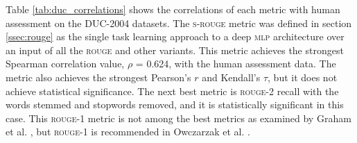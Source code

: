 \documentclass[11pt,a4paper]{article}
\newcommand{\rouge}{\textsc{rouge}\xspace}
\newcommand{\mlp}{\textsc{mlp}\xspace}
\newcommand{\duc}{\textsc{DUC-2004}\xspace}
\newcommand{\srouge}{\textsc{s-rouge}\xspace}
\begin{document}
Table \ref{tab:duc_correlations} shows the correlations of each metric with human assessment 
on the \duc datasets. The \srouge metric was defined in section \ref{ssec:rouge} as the 
single task learning approach to a deep \mlp architecture over an input of all the \rouge 
and other variants. This metric achieves the strongest Spearman correlation value, $\rho$ = 0.624, 
with the human assessment data. The metric also achieves the strongest Pearson's $r$ and 
Kendall's $\tau$, but it does not achieve statistical significance. The next best metric 
is \rouge-2 recall with the words stemmed and stopwords removed, and it is statistically 
significant in this case. This \rouge-1 metric is not among the best metrics as examined 
by Graham et al. , but \rouge-1 is recommended in Owczarzak et al. .
\end{document}
